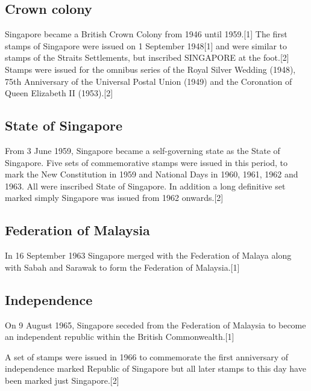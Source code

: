 \subsection{Crown colony}

Singapore became a British Crown Colony from 1946 until 1959.[1] The first stamps of Singapore were issued on 1 September 1948[1] and were similar to stamps of the Straits Settlements, but inscribed SINGAPORE at the foot.[2] Stamps were issued for the omnibus series of the Royal Silver Wedding (1948), 75th Anniversary of the Universal Postal Union (1949) and the Coronation of Queen Elizabeth II (1953).[2]


\subsection{State of Singapore}

From 3 June 1959, Singapore became a self-governing state as the State of Singapore. Five sets of commemorative stamps were issued in this period, to mark the New Constitution in 1959 and National Days in 1960, 1961, 1962 and 1963. All were inscribed State of Singapore. In addition a long definitive set marked simply Singapore was issued from 1962 onwards.[2]

\subsection{Federation of Malaysia}

In 16 September 1963 Singapore merged with the Federation of Malaya along with Sabah and Sarawak to form the Federation of Malaysia.[1]

\subsection{Independence}

On 9 August 1965, Singapore seceded from the Federation of Malaysia to become an independent republic within the British Commonwealth.[1] 

A set of stamps were issued in 1966 to commemorate the first anniversary of independence marked Republic of Singapore but all later stamps to this day have been marked just Singapore.[2]


